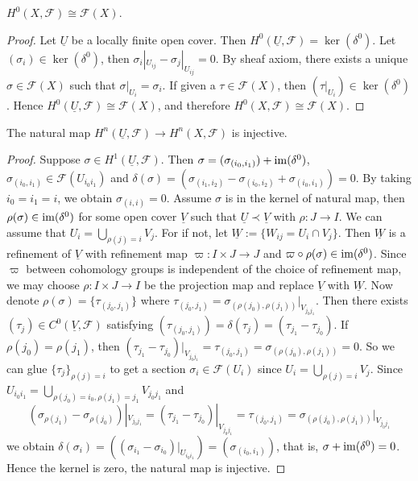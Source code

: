 \begin{prop}
    $H^0(X,\mathcal{F})\cong\mathcal{F}(X)$.
\end{prop}
\begin{proof}
    Let $\underline{U}$ be a locally finite open cover.
    Then $H^0(\underline{U},\mathcal{F})=\ker(\delta^0)$.
    Let $(\sigma_i)\in\ker(\delta^0)$, then $\sigma_i|_{U_{ij}}-\sigma_j|_{U_{ij}}=0$.
    By sheaf axiom, there exists a unique $\sigma\in\mathcal{F}(X)$ such that $\sigma|_{U_i}=\sigma_i$.
    If given a $\tau\in\mathcal{F}(X)$, then $(\tau|_{U_i})\in\ker(\delta^0)$.
    Hence $H^0(\underline{U},\mathcal{F})\cong\mathcal{F}(X)$, and therefore $H^0(X,\mathcal{F})\cong\mathcal{F}(X)$.
\end{proof}

\begin{prop}\label{H^1(U) to H^1(X)}
    The natural map $H^n(\underline{U},\mathcal{F})\to H^n(X,\mathcal{F})$ is injective.
\end{prop}
\begin{proof}
    Suppose $\sigma\in H^1(\underline{U},\mathcal{F})$.
    Then $\sigma=(\sigma_{(i_0,i_1)})+\operatorname{im}(\delta^0)$, $\sigma_{(i_0,i_1)}\in\mathcal{F}(U_{i_0i_1})$ and $\delta(\sigma)=(\sigma_{(i_1,i_2)}-\sigma_{(i_0,i_2)}+\sigma_{(i_0,i_1)})=0$.
    By taking $i_0=i_1=i$, we obtain $\sigma_{(i,i)}=0$.
    Assume $\sigma$ is in the kernel of natural map, then $\rho(\sigma)\in\operatorname{im}(\delta^0)$ for some open cover $\underline{V}$ such that $\underline{U}\prec\underline{V}$ with $\rho:J\to I$. 
    We can assume that $U_i=\bigcup_{\rho(j)=i}V_j$.
    For if not, let $\underline{W}:=\{W_{ij}=U_i\cap V_j\}$.
    Then $\underline{W}$ is a refinement of $\underline{V}$ with refinement map $\varpi:I\times J\to J$ and $\varpi\circ\rho(\sigma)\in\operatorname{im}(\delta^0)$.
    Since $\varpi$ between cohomology groups is independent of the choice of refinement map, we may choose $\rho:I\times J\to I$ be the projection map and replace $\underline{V}$ with $\underline{W}$.
    Now denote $\rho(\sigma)=\{\tau_{(j_0,j_1)}\}$ where $\tau_{(j_0,j_1)}=\sigma_{(\rho(j_0),\rho(j_1))}|_{V_{j_0j_1}}$.
    Then there exists $(\tau_j)\in C^0(\underline{V},\mathcal{F})$ satisfying $(\tau_{(j_0,j_1)})=\delta(\tau_j)=(\tau_{j_1}-\tau_{j_0})$.
    If $\rho(j_0)=\rho(j_1)$, then $(\tau_{j_1}-\tau_{j_0})|_{V_{j_0j_1}}=\tau_{(j_0,j_1)}=\sigma_{(\rho(j_0),\rho(j_1))}=0$.
    So we can glue $\{\tau_j\}_{\rho(j)=i}$ to get a section $\sigma_i\in\mathcal{F}(U_i)$ since $U_i=\bigcup_{\rho(j)=i}V_j$.
    Since $U_{i_0i_1}=\bigcup_{\rho(j_0)=i_0,\rho(j_1)=j_1}V_{j_0j_1}$ and 
    \[(\sigma_{\rho(j_1)}-\sigma_{\rho(j_0)})|_{V_{j_0j_1}}=(\tau_{j_1}-\tau_{j_0})|_{V_{j_0j_1}}=\tau_{(j_0,j_1)}=\sigma_{(\rho(j_0),\rho(j_1))}|_{V_{j_0j_1}}\]
    we obtain $\delta(\sigma_i)=((\sigma_{i_1}-\sigma_{i_0})|_{U_{i_0i_1}})=(\sigma_{(i_0,i_1)})$, that is, $\sigma+\operatorname{im}(\delta^0)=0$.
    Hence the kernel is zero, the natural map is injective.
\end{proof}

